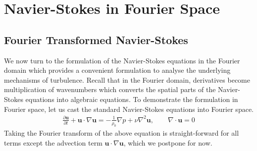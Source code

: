 \section{Navier-Stokes in Fourier Space}
\subsection{Fourier Transformed Navier-Stokes}
We now turn to the formulation of the Navier-Stokes equations in the Fourier domain which provides a convenient formulation to analyse the underlying mechanisms of turbulence. Recall that in the Fourier domain, derivatives become multiplication of wavenumbers which converts the spatial parts of the Navier-Stokes equations into algebraic equations. To demonstrate the formulation in Fourier space, let us cast the standard Navier-Stokes equations into Fourier space. 
\begin{align}
\frac{\partial \bm{u}}{\partial t} + \bm{u}\cdot\nabla\bm{u} = -\frac{1}{\rho_{0}}\nabla p + \nu\nabla^{2}\bm{u}, \qquad \nabla\cdot\bm{u}=0
\end{align}
Taking the Fourier transform of the above equation is straight-forward for all terms except the advection term $\bm{u}\cdot\nabla\bm{u}$, which we postpone for now.

